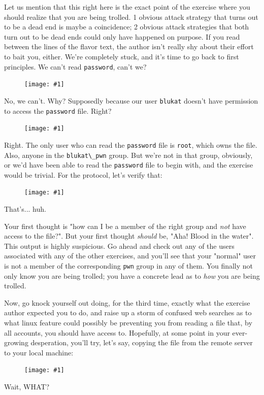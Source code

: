 \documentclass{article}
\newcommand{\displayimage}[1] {
\begin{figure}[H]
    \centering
    \texttt{[image: \#1]} 
\end{figure}
}
\newcommand{\xcode}[2]{\colorbox{ubuntuback}{\lstinline[language=#1]|#2|}}
\newcommand{\code}[1]{\colorbox{ubuntuback}{\texttt{#1}}}
\begin{document}
Let us mention that this right here is the exact point of the exercise where you should realize that you are being trolled. 1 obvious attack strategy that turns out to be a dead end is maybe a coincidence; 2 obvious attack strategies that both turn out to be dead ends could only have happened on purpose. If you read between the lines of the flavor text, the author isn't really shy about their effort to bait you, either.  We're completely stuck, and it's time to go back to first principles. We can't read \xcode{C}{password}, can't we?  
\displayimage{./exercises/19_blukat/cat_password.png}

No, we can't. Why? Supposedly because our user \xcode{bash}{blukat} doesn't have permission to access the \xcode{bash}{password} file. Right?

\displayimage{./exercises/19_blukat/file_permissions.png}

Right. The only user who can read the \xcode{bash}{password} file is \xcode{bash}{root}, which owns the file. Also, anyone in the \xcode{bash}{blukat\_pwn} group. But we're not in that group, obviously, or we'd have been able to read the \xcode{bash}{password} file to begin with, and the exercise would be trivial. For the protocol, let's verify that:

\displayimage{./exercises/19_blukat/group_check.png}

That's... huh.

Your first thought is "how can I be a member of the right group and \textit{not} have access to the file?". But your first thought \textit{should} be, "Aha! Blood in the water". This output is highly suspicious. Go ahead and check out any of the users associated with any of the other exercises, and you'll see that your "normal" user is not a member of the corresponding \code{pwn} group in any of them. You finally not only know you are being trolled; you have a concrete lead as to \textit{how} you are being trolled.

Now, go knock yourself out doing, for the third time, exactly what the exercise author expected you to do, and raise up a storm of confused web searches as to what linux feature could possibly be preventing you from reading a file that, by all accounts, you should have access to. Hopefully, at some point in your ever-growing desperation, you'll try, let's say, copying the file from the remote server to your local machine:

\displayimage{./exercises/19_blukat/locally.png}

Wait, WHAT?
\end{document}
